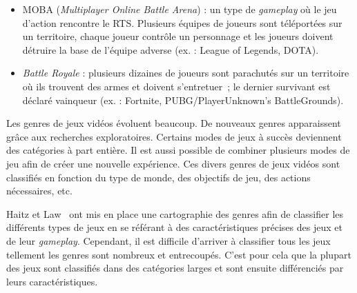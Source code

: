 \begin{itemize}
    \item MOBA (\emph{Multiplayer Online Battle Arena}) : un type de \emph{gameplay} o\`u le jeu d'action rencontre le RTS. Plusieurs équipes de joueurs sont téléportées sur un territoire, chaque joueur contrôle un personnage et les joueurs doivent détruire la base de l'équipe adverse (ex. : League of Legends, DOTA).
    \item \emph{Battle Royale} : plusieurs dizaines de joueurs sont parachutés sur un territoire o\`u ils trouvent des armes et doivent s'entretuer~; le dernier survivant est déclaré vainqueur (ex. : Fortnite, PUBG/PlayerUnknown's BattleGrounds).
\end{itemize}

Les genres de jeux vidéos évoluent beaucoup.
De nouveaux genres apparaissent grâce aux recherches exploratoires.
Certains modes de jeux à succès deviennent des catégories à part entière.
Il est aussi possible de combiner plusieurs modes de jeu afin de créer une nouvelle expérience.
Ces divers genres de jeux vidéos sont classifiés en fonction du type de monde, des objectifs de jeu, des actions nécessaires, etc. 

Haitz et Law~\cite{HeintzStephanie2015TGGM} ont mis en place une cartographie des genres afin de classifier les différents types de jeux en se référant à des caractéristiques précises des jeux et de leur \emph{gameplay}.
Cependant, il est difficile d'arriver à classifier tous les jeux tellement les genres sont nombreux et entrecoupés.
C'est pour cela que la plupart des jeux sont classifiés dans des catégories larges et sont ensuite différenciés par leurs caractéristiques.

